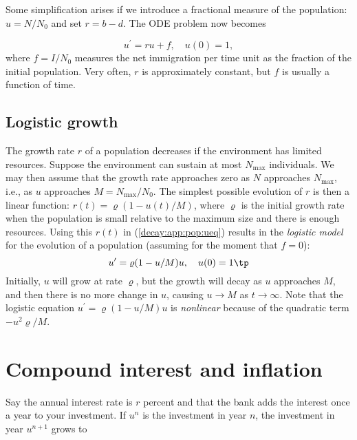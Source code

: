 \documentclass[graybox,sectrefs,envcountresetchap,open=right,final]{svmonodo}
\begin{document}
Some simplification arises if we introduce a fractional measure
of the population: $u=N/N_0$ and set $r=b-d$. The ODE problem
now becomes

\begin{equation}
u^{\prime} = ru + f,\quad u(0)=1,
\label{decay:app:pop:ueq}
\end{equation}
where $f=I/N_0$ measures the net immigration per time unit as
the fraction of the initial population. Very often, $r$ is approximately
constant, but $f$ is usually a function of time.

\subsection{Logistic growth}
\label{decay:app:pop:log}


The growth rate $r$ of a population decreases if the environment
has limited resources. Suppose the environment can sustain at
most $N_{\max}$ individuals. We may then assume that the growth rate
approaches zero as $N$ approaches $N_{\max}$, i.e., as $u$ approaches
$M=N_{\max}/N_0$. The simplest possible evolution of $r$ is then a
linear function: $r(t)={\varrho}(1-u(t)/M)$, where $\varrho$
is the initial growth rate when the population is small relative to the
maximum size and there is enough resources. Using this $r(t)$ in
(\ref{decay:app:pop:ueq}) results in the \emph{logistic model} for the
evolution of a population (assuming for the moment that $f=0$):
\begin{equation}
u^{\prime} = {\varrho}(1-u/M)u,\quad u(0)=1
\tp
\label{decay:app:pop:logistic}
\end{equation}
Initially, $u$ will grow at rate $\varrho$, but the growth will decay
as $u$ approaches $M$, and then there is no more change in $u$, causing
$u\rightarrow M$ as $t\rightarrow\infty$.
Note that the logistic equation $u^{\prime}={\varrho}(1-u/M)u$ is \emph{nonlinear} because
of the quadratic term $-u^2{\varrho}/M$.

\section{Compound interest and inflation}
\label{decay:app:interest}

Say the annual interest rate is $r$ percent and that the bank
adds the interest once a year to your investment.
If $u^n$ is the investment in year $n$, the investment in year $u^{n+1}$
grows to
\end{document}
